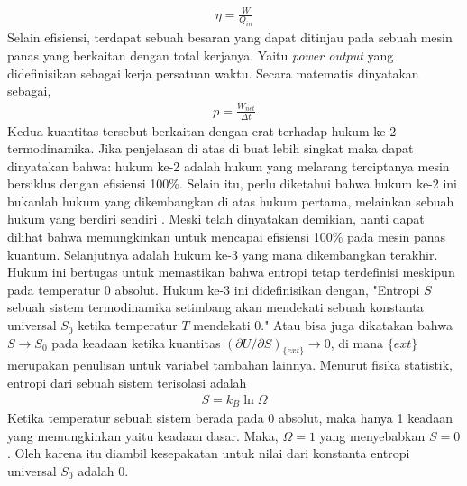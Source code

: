 \begin{align}
    \eta = \frac{W}{Q_{in}}
\end{align}
Selain efisiensi, terdapat sebuah besaran yang dapat ditinjau pada sebuah mesin panas yang berkaitan dengan total kerjanya. Yaitu \textit{power output} yang didefinisikan sebagai kerja persatuan waktu. Secara matematis dinyatakan sebagai,
\begin{align}
    p = \frac{W_{net}}{\Delta t} \label{eq:PowerOutput}
\end{align}
Kedua kuantitas tersebut berkaitan dengan erat terhadap hukum ke-2 termodinamika. Jika penjelasan di atas di buat lebih singkat maka dapat dinyatakan bahwa: hukum ke-2 adalah hukum yang melarang terciptanya mesin bersiklus dengan efisiensi 100\%. Selain itu, perlu diketahui bahwa hukum ke-2 ini bukanlah hukum yang dikembangkan di atas hukum pertama, melainkan sebuah hukum yang berdiri sendiri \cite{Zemansky1997Thermo}. Meski telah dinyatakan demikian, nanti dapat dilihat bahwa memungkinkan untuk mencapai efisiensi 100\% pada mesin panas kuantum. Selanjutnya adalah hukum ke-3 yang mana dikembangkan terakhir. Hukum ini bertugas untuk memastikan bahwa entropi tetap terdefinisi meskipun pada temperatur 0 absolut. Hukum ke-3 ini didefinisikan dengan, "Entropi \(S\) sebuah sistem termodinamika setimbang akan mendekati sebuah konstanta universal \(S_0\) ketika temperatur \(T\) mendekati 0." Atau bisa juga dikatakan bahwa \(S \rightarrow S_0\) pada keadaan ketika kuantitas \((\partial U/\partial S)_{\{ext\}} \rightarrow 0\), di mana \(\{ext\}\) merupakan penulisan untuk variabel tambahan lainnya. Menurut fisika statistik, entropi dari sebuah sistem terisolasi adalah
\begin{align}
    S = k_B \ln{\Omega}
\end{align}
Ketika temperatur sebuah sistem berada pada 0 absolut, maka hanya 1 keadaan yang memungkinkan yaitu keadaan dasar. Maka, \(\Omega = 1\) yang menyebabkan \(S = 0\). Oleh karena itu diambil kesepakatan untuk nilai dari konstanta entropi universal \(S_0\) adalah 0. \cite{Schroeder2020Thermal}

